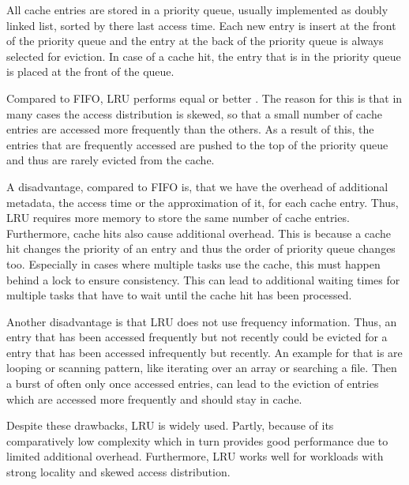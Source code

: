 \documentclass[
	12pt,
	a4paper,
	abstract,
	bibliography=totoc,
	chapterprefix,
	headings=openright,
	numbers=endperiod,
	parskip=half,
	twoside,
]{scrreprt}
\begin{document}
All cache entries are stored in a priority queue, usually implemented as doubly linked list, sorted by there last access time.
Each new entry is insert at the front of the priority queue and the entry at the back of the priority queue is always selected for eviction.
In case of a cache hit, the entry that is in the priority queue is placed at the front of the queue.


Compared to FIFO, LRU performs equal or better \cite{van1992lru}.
The reason for this is that in many cases the access distribution is skewed, so that a small number of cache entries are accessed more frequently than the others.
As a result of this, the entries that are frequently accessed are pushed to the top of the priority queue and thus are rarely evicted from the cache.

A disadvantage, compared to FIFO is, that we have the overhead of additional metadata, the access time or the approximation of it, for each cache entry.
Thus, LRU requires more memory to store the same number of cache entries.
Furthermore, cache hits also cause additional overhead. 
This is because a cache hit changes the priority of an entry and thus the order of priority queue changes too.
Especially in cases where multiple tasks use the cache, this must happen behind a lock to ensure consistency.
This can lead to additional waiting times for multiple tasks that have to wait until the cache hit has been processed.

Another disadvantage is that LRU does not use frequency information.
Thus, an entry that has been accessed frequently but not recently could be evicted for a entry that has been accessed infrequently but recently.
An example for that is are looping or scanning pattern, like iterating over an array or searching a file.
Then a burst of often only once accessed entries, can lead to the eviction of entries which are accessed more frequently and should stay in cache.

Despite these drawbacks, LRU is widely used.
Partly, because of its comparatively low complexity 
which in turn provides good performance due to limited additional overhead.
Furthermore, LRU works well for workloads with strong locality and skewed access distribution.
\end{document}
